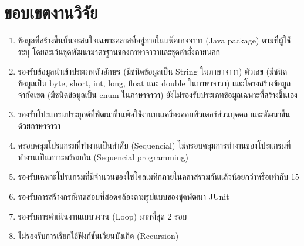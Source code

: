 \section{ขอบเขตงานวิจัย}

\begin{enumerate}
    \item ข้อมูล{\scg}ที่สร้างขึ้นนั้นจะสนใจเฉพาะคลาสที่อยู่ภายในแพ็คเกจจาวา (Java package) ตามที่ผู้ใช้ระบุ 
        โดยละเว้นชุดพัฒนามาตรฐานของภาษาจาวาและชุดคำสั่งภายนอก
    \item รองรับข้อมูลนำเข้าประเภทตัวอักษร (มีชนิดข้อมูลเป็น String ในภาษาจาวา) ตัวเลข 
        (มีชนิดข้อมูลเป็น byte, short, int, long, float และ double ในภาษาจาวา) และโครงสร้างข้อมูลจำกัดเขต (มีชนิดข้อมูลเป็น enum ในภาษาจาวา) 
        ยังไม่รองรับประเภทข้อมูลเฉพาะที่สร้างขึ้นเอง
    \item รองรับโปรแกรมประยุกต์ที่พัฒนาขึ้นเพื่อใช้งานบนเครื่องคอมพิวเตอร์ส่วนบุคคล และ{\sourcecode}พัฒนาขึ้นด้วยภาษาจาวา 
    \item ครอบคลุมโปรแกรมที่ทำงานเป็นลำดับ (Sequencial) ไม่ครอบคลุมการทำงานของโปรแกรมที่ทำงานเป็นภาวะพร้อมกัน (Sequencial programming)
    \item รองรับเฉพาะโปรแกรมที่มีจำนวนของไซโคลเมทิกภายในคลาสรวมกันแล้วน้อยกว่าหรือเท่ากับ 15
    \item รองรับการสร้างกรณีทดสอบที่สอดคล้องตามรูปแบบของชุดพัฒนา JUnit
    \item รองรับการดำเนินงานแบบวงวน (Loop) มากที่สุด 2 รอบ
    \item ไม่รองรับการเรียกใช้ฟังก์ชันเวียนบังเกิด (Recursion)
\end{enumerate}
